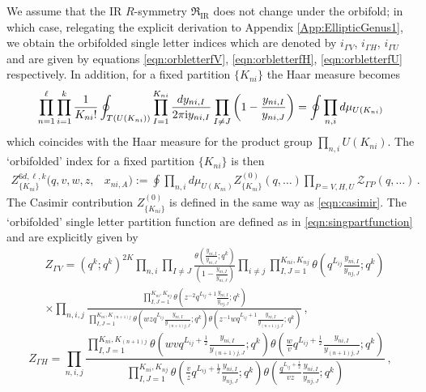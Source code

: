 \documentclass[main.tex]{subfiles}
\begin{document}
We assume that the IR $R$-symmetry $\mathfrak{R}_{\text{IR}}$ does not change under the orbifold; in which case, relegating the explicit derivation to Appendix \ref{App:EllipticGenus1}, we obtain the orbifolded single letter indices which are denoted by $i_{\Gamma V}$, $i_{\Gamma H}$, $i_{\Gamma U}$ and are given by equations \eqref{eqn:orbletterfV}, \eqref{eqn:orbletterfH}, \eqref{eqn:orbletterfU} respectively. In addition, for a fixed partition $\{K_{ni}\}$ the Haar measure becomes
\begin{equation}
\prod_{n=1}^{\ell}\prod_{i=1}^k\frac{1}{K_{ni}!}\oint_{T(U(K_{ni}))}\prod_{I=1}^{K_{ni}}\frac{dy_{ni,I}}{2\pi\mathrm{i} y_{ni,I}}\prod_{I\neq J}\left(1-\frac{y_{ni,I}}{ y_{ni,J}}\right)=\oint\prod_{n,i}d\mu_{U(K_{ni})}
\end{equation}
which coincides with the Haar measure for the product group $\prod_{n,i}U(K_{ni})$. The `orbifolded' index for a fixed partition $\{K_{ni}\}$ is then
\begin{equation}\label{eqn:indexfixedmn}
\begin{aligned}
Z^{6d,\ell,k}_{\{K_{ni}\}}(q,v,w,z,&x_{ni,A}):=\oint\prod_{n,i}d\mu_{U(K_{ni})}Z^{(0)}_{\{K_{ni}\}}(q,\dots)\prod_{P= V,H,U}\mathcal{Z}_{\Gamma P}(q,\dots)\,.
\end{aligned}
\end{equation}
 The Casimir contribution $Z^{(0)}_{\{K_{ni}\}}$ is defined in the same way as \eqref{eqn:casimir}. The `orbifolded' single letter partition function are defined as in \eqref{eqn:singpartfunction} and are explicitly given by
\begin{equation}
\begin{aligned}
&Z_{\Gamma V}=\left(q^k;q^k\right)^{2K}\prod_{n,i}\prod_{I\neq J}\frac{\theta\left(\frac{y_{ni,I}}{y_{ni,J}};q^k\right)}{\left(1-\frac{y_{ni,I}}{y_{ni,J}}\right)}\prod_{i\neq j}\prod_{I,J=1}^{K_{ni},K_{nj}}\theta\left(q^{L_{ij}}\frac{y_{ni,I}}{y_{nj,J}};q^k\right)\\
&\times\prod_{n,i,j}\frac{\prod_{I,J=1}^{K_{ni},K_{nj}}\theta\left(z^{-2}q^{L_{ij}+1}\frac{y_{ni,I}}{y_{nj,J}};q^k\right)}{\prod_{I,J=1}^{K_{ni},K_{(n+1)j}}\theta\left(wzq^{L_{ij}}\frac{y_{ni,I}}{y_{(n+1)j,J}};q^k\right)\theta\left(z^{-1}wq^{L_{ij}+1}\frac{y_{ni,I}}{y_{(n+1)j,J}};q^k\right)}\,,
\end{aligned}
\end{equation}
\begin{equation}
Z_{\Gamma H}=\prod_{n,i,j}\frac{\prod_{I,J=1}^{K_{ni},K_{(n+1)j}}\theta\left(wvq^{L_{ij}+\frac{1}{2}}\frac{y_{ni,I}}{y_{(n+1)j,J}};q^k\right)\theta\left(\frac{w}{v}q^{L_{ij}+\frac{1}{2}}\frac{y_{ni,I}}{y_{(n+1)j,J}};q^k\right)}{\prod_{I,J=1}^{K_{ni},K_{nj}}\theta\left(\frac{v}{z}q^{L_{ij}+\frac{1}{2}}\frac{y_{ni,I}}{y_{nj,J}};q^k\right)\theta\left(\frac{q^{L_{ij}+\frac{1}{2}}}{vz}\frac{y_{ni,I}}{y_{nj,J}};q^k\right)}\,,
\end{equation}
\end{document}
